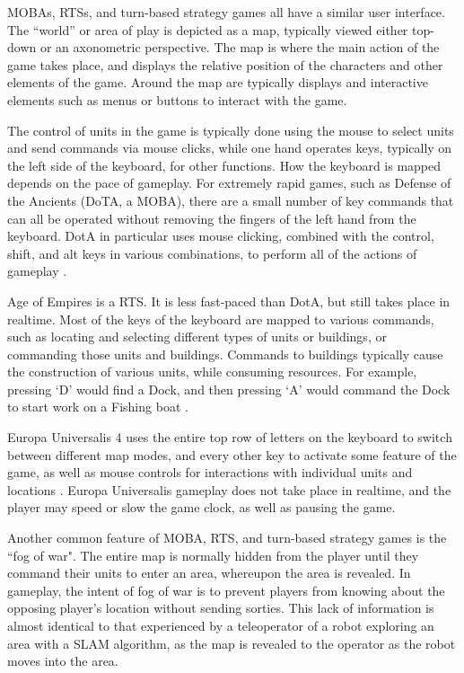 MOBAs, RTSs, and turn-based strategy games all have a similar user interface. The ``world'' or area of play is depicted as a map, typically viewed either top-down or an axonometric perspective. The map is where the main action of the game takes place, and displays the relative position of the characters and other elements of the game. Around the map are typically displays and interactive elements such as menus or buttons to interact with the game. 

The control of units in the game is typically done using the mouse to select units and send commands via mouse clicks, while one hand operates keys, typically on the left side of the keyboard, for other functions. 
How the keyboard is mapped depends on the pace of gameplay. For extremely rapid games, such as Defense of the Ancients (DoTA, a MOBA), there are a small number of key commands that can all be operated without removing the fingers of the left hand from the keyboard. DotA in particular uses mouse clicking, combined with the control, shift, and alt keys in various combinations, to perform all of the actions of gameplay . 

Age of Empires is a RTS. It is less fast-paced than DotA, but still takes place in realtime. Most of the keys of the keyboard are mapped to various commands, such as locating and selecting different types of units or buildings, or commanding those units and buildings. Commands to buildings typically cause the construction of various units, while consuming resources. For example, pressing `D' would find a Dock, and then pressing `A' would command the Dock to start work on a Fishing boat . 

Europa Universalis 4 uses the entire top row of letters on the keyboard to switch between different map modes, and every other key to activate some feature of the game, as well as mouse controls for interactions with individual units and locations . Europa Universalis gameplay does not take place in realtime, and the player may speed or slow the game clock, as well as pausing the game. 

Another common feature of MOBA, RTS, and turn-based strategy games is the ``fog of war". The entire map is normally hidden from the player until they command their units to enter an area, whereupon the area is revealed. In gameplay, the intent of fog of war is to prevent players from knowing about the opposing player's location without sending sorties. This lack of information is almost identical to that experienced by a teleoperator of a robot exploring an area with a SLAM algorithm, as the map is revealed to the operator as the robot moves into the area. 

